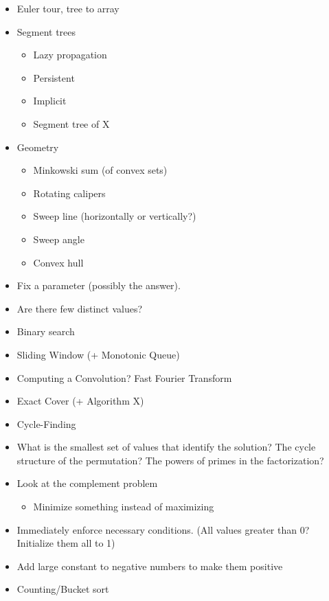 \documentclass[9pt,a4paper,twocolumn,landscape,oneside]{amsart}
\newenvironment{myitemize}
{ \begin{itemize}[leftmargin=.5cm]
    \setlength{\itemsep}{0pt}
    \setlength{\parskip}{0pt}
    \setlength{\parsep}{0pt}     }
{ \end{itemize}                  }
\begin{document}
\begin{multicols*}{3}
\begin{myitemize}
                \item Euler tour, tree to array
                \item Segment trees
                    \begin{itemize}
                        \item Lazy propagation
                        \item Persistent
                        \item Implicit
                        \item Segment tree of X
                    \end{itemize}
                \item Geometry
                    \begin{itemize}
                        \item Minkowski sum (of convex sets)
                        \item Rotating calipers
                        \item Sweep line (horizontally or vertically?)
                        \item Sweep angle
                        \item Convex hull
                    \end{itemize}
                \item Fix a parameter (possibly the answer).
                \item Are there few distinct values?
                \item Binary search
                \item Sliding Window (+ Monotonic Queue)
                \item Computing a Convolution? Fast Fourier Transform
                \item Exact Cover (+ Algorithm X)
                \item Cycle-Finding
                \item What is the smallest set of values that identify the solution? The cycle structure of the permutation? The powers of primes in the factorization?
                \item Look at the complement problem
                    \begin{itemize}
                        \item Minimize something instead of maximizing
                    \end{itemize}
                \item Immediately enforce necessary conditions. (All values greater than 0? Initialize them all to 1)
                \item Add large constant to negative numbers to make them positive
                \item Counting/Bucket sort
            \end{myitemize}


\end{multicols*}
\end{document}
